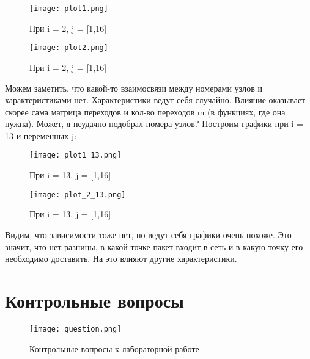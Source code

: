 \begin{figure}[H]
    \centering
    \texttt{[image: plot1.png]}
    \caption{При i = 2, j = [1,16]}
\end{figure}

\begin{figure}[H]
    \centering
    \texttt{[image: plot2.png]}
    \caption{При i = 2, j = [1,16]}
\end{figure}

Можем заметить, что какой-то взаимосвязи между номерами узлов и характеристиками нет. Характеристики ведут себя случайно. Влияние
оказывает скорее сама матрица переходов и кол-во переходов m (в функциях, где она нужна). Может, я неудачно подобрал номера узлов?
Построим графики при i = 13 и переменных j:

\begin{figure}[H]
    \centering
    \texttt{[image: plot1\_13.png]}
    \caption{При i = 13, j = [1,16]}
\end{figure}

\begin{figure}[H]
    \centering
    \texttt{[image: plot\_2\_13.png]}
    \caption{При i = 13, j = [1,16]}
\end{figure}

Видим, что зависимости тоже нет, но ведут себя графики очень похоже. Это значит, что нет разницы, в какой точке пакет входит в сеть
и в какую точку его необходимо доставить. На это влияют другие характеристики.

\section*{\textbf{Контрольные вопросы}}

\begin{figure}[H]
    \centering
    \texttt{[image: question.png]}
    \caption{Контрольные вопросы к лабораторной работе}
\end{figure}

